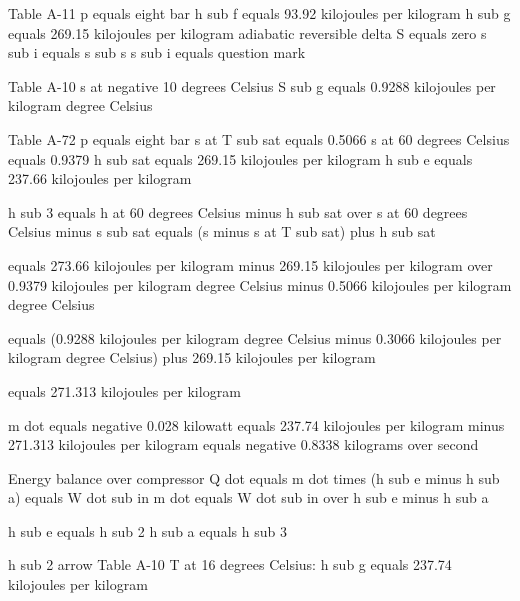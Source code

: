 Table A-11  
p equals eight bar  
h sub f equals 93.92 kilojoules per kilogram  
h sub g equals 269.15 kilojoules per kilogram  
adiabatic reversible  
delta S equals zero  
s sub i equals s sub s  
s sub i equals question mark  

Table A-10  
s at negative 10 degrees Celsius  
S sub g equals 0.9288 kilojoules per kilogram degree Celsius  

Table A-72  
p equals eight bar  
s at T sub sat equals 0.5066  
s at 60 degrees Celsius equals 0.9379  
h sub sat equals 269.15 kilojoules per kilogram  
h sub e equals 237.66 kilojoules per kilogram  

h sub 3 equals h at 60 degrees Celsius minus h sub sat over s at 60 degrees Celsius minus s sub sat  
equals (s minus s at T sub sat) plus h sub sat  

equals 273.66 kilojoules per kilogram minus 269.15 kilojoules per kilogram over 0.9379 kilojoules per kilogram degree Celsius minus 0.5066 kilojoules per kilogram degree Celsius  

equals (0.9288 kilojoules per kilogram degree Celsius minus 0.3066 kilojoules per kilogram degree Celsius) plus 269.15 kilojoules per kilogram  

equals 271.313 kilojoules per kilogram  

m dot equals negative 0.028 kilowatt  
equals 237.74 kilojoules per kilogram minus 271.313 kilojoules per kilogram  
equals negative 0.8338 kilograms over second  

Energy balance over compressor  
Q dot equals m dot times (h sub e minus h sub a) equals W dot sub in  
m dot equals W dot sub in over h sub e minus h sub a  

h sub e equals h sub 2  
h sub a equals h sub 3  

h sub 2 arrow Table A-10  
T at 16 degrees Celsius: h sub g equals 237.74 kilojoules per kilogram